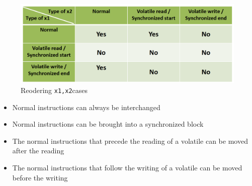 \begin{paracol}{2}
   
   \begin{figure}[htbp]
      \centering
      \includegraphics{images/jmm_reordering.png}
      \caption{Reodering \lstinline|x1,x2|cases}
      \label{fig:jmm_reordering}
   \end{figure}

   \switchcolumn
\begin{itemize}
	\item Normal instructions can always be interchanged
	\item Normal instructions can be brought into a synchronized block
	\item The normal instructions that precede the reading of a volatile can be moved after the reading
	\item The normal instructions that follow the writing of a volatile can be moved before the writing
\end{itemize}
\end{paracol}